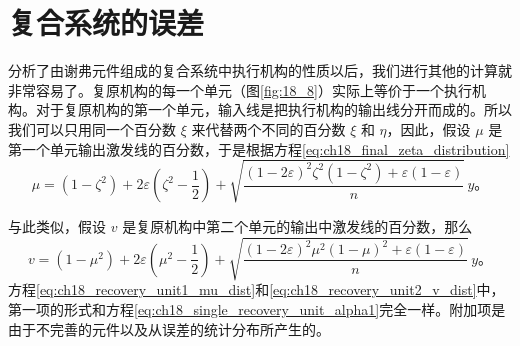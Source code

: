\section{复合系统的误差}

分析了由谢弗元件组成的复合系统中执行机构的性质以后，我们进行其他的计算就非常容易了。复原机构的每一个单元（图\ref{fig:18_8}）实际上等价于一个执行机构。对于复原机构的第一个单元，输入线是把执行机构的输出线分开而成的。所以我们可以只用同一个百分数 $\xi$ 来代替两个不同的百分数 $\xi$ 和 $\eta$，因此，假设 $\mu$ 是第一个单元输出激发线的百分数，于是根据方程\eqref{eq:ch18_final_zeta_distribution}
\begin{equation}
\mu = (1-\zeta^2) + 2\varepsilon\left(\zeta^2 - \frac{1}{2}\right) + \sqrt{\frac{(1-2\varepsilon)^2\zeta^2(1-\zeta^2)+\varepsilon(1-\varepsilon)}{n}}\,y。
\label{eq:ch18_recovery_unit1_mu_dist}
\end{equation}

与此类似，假设 $v$ 是复原机构中第二个单元的输出中激发线的百分数，那么
\begin{equation}
v = (1-\mu^2) + 2\varepsilon\left(\mu^2 - \frac{1}{2}\right) + \sqrt{\frac{(1-2\varepsilon)^2\mu^2(1-\mu)^2+\varepsilon(1-\varepsilon)}{n}}\,y。
\label{eq:ch18_recovery_unit2_v_dist}
\end{equation}
方程\eqref{eq:ch18_recovery_unit1_mu_dist}和\eqref{eq:ch18_recovery_unit2_v_dist}中，第一项的形式和方程\eqref{eq:ch18_single_recovery_unit_alpha1}完全一样。附加项是由于不完善的元件以及从误差的统计分布所产生的。

